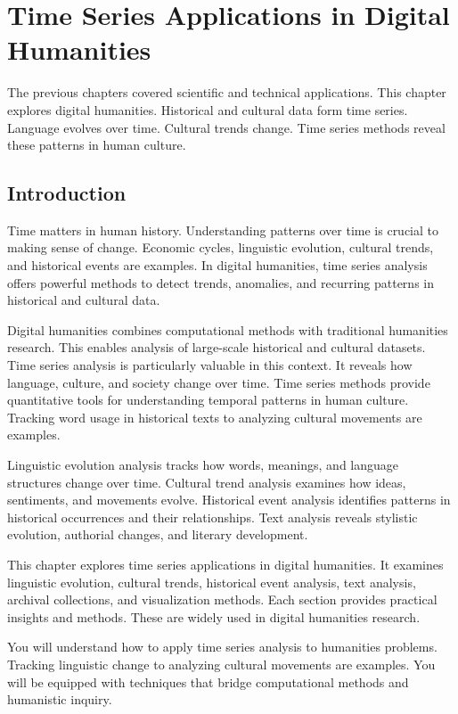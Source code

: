 \chapter{Time Series Applications in Digital Humanities}

The previous chapters covered scientific and technical applications. This chapter explores digital humanities. Historical and cultural data form time series. Language evolves over time. Cultural trends change. Time series methods reveal these patterns in human culture.

\section{Introduction}

Time matters in human history. Understanding patterns over time is crucial to making sense of change. Economic cycles, linguistic evolution, cultural trends, and historical events are examples. In digital humanities, time series analysis offers powerful methods to detect trends, anomalies, and recurring patterns in historical and cultural data.

Digital humanities combines computational methods with traditional humanities research. This enables analysis of large-scale historical and cultural datasets. Time series analysis is particularly valuable in this context. It reveals how language, culture, and society change over time. Time series methods provide quantitative tools for understanding temporal patterns in human culture. Tracking word usage in historical texts to analyzing cultural movements are examples.

Linguistic evolution analysis tracks how words, meanings, and language structures change over time. Cultural trend analysis examines how ideas, sentiments, and movements evolve. Historical event analysis identifies patterns in historical occurrences and their relationships. Text analysis reveals stylistic evolution, authorial changes, and literary development.

This chapter explores time series applications in digital humanities. It examines linguistic evolution, cultural trends, historical event analysis, text analysis, archival collections, and visualization methods. Each section provides practical insights and methods. These are widely used in digital humanities research.

You will understand how to apply time series analysis to humanities problems. Tracking linguistic change to analyzing cultural movements are examples. You will be equipped with techniques that bridge computational methods and humanistic inquiry.

